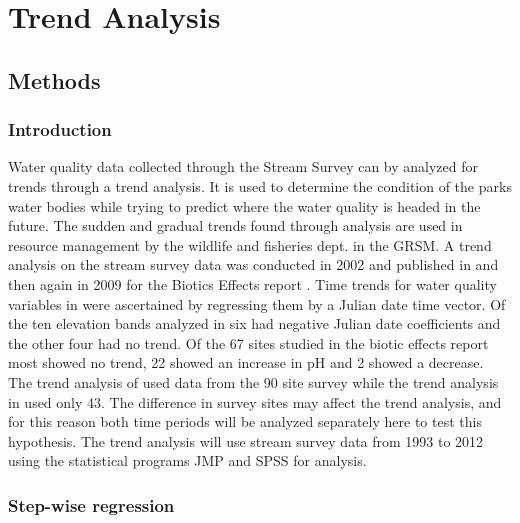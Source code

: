 \chapter{Trend Analysis}\label{ch:TA}

\section{Methods}

\subsection{Introduction}

Water quality data collected through the Stream Survey can by analyzed for trends through a trend analysis.
It is used to determine the condition of the parks water bodies while trying to predict where the water quality is headed in the future. 
The sudden and gradual trends found through analysis are used in resource management by the wildlife and fisheries dept. in the GRSM.
A trend analysis on the stream survey data was conducted in 2002 and published in \citet{robinson2008ph} and then again in 2009 for the Biotics Effects report \citep{cai2013}.
Time trends for water quality variables  in \citet{robinson2008ph} were ascertained by regressing them by a Julian date time vector.
Of the ten elevation bands analyzed in \citet{robinson2008ph} six had negative Julian date coefficients and the other four had no trend. 
Of the 67 sites studied in the biotic effects report most showed no trend, 22 showed an increase in pH and 2 showed a decrease\citep{cai2013}. 
The trend analysis of \citet{robinson2008ph} used data from the 90 site survey while the trend analysis in \citet{cai2013} used only 43.
The difference in survey sites may affect the trend analysis, and for this reason both time periods will be analyzed separately here to test this hypothesis.
The trend analysis will use stream survey data from 1993 to 2012 using the statistical programs JMP and SPSS for analysis.

\subsection{Step-wise regression}

